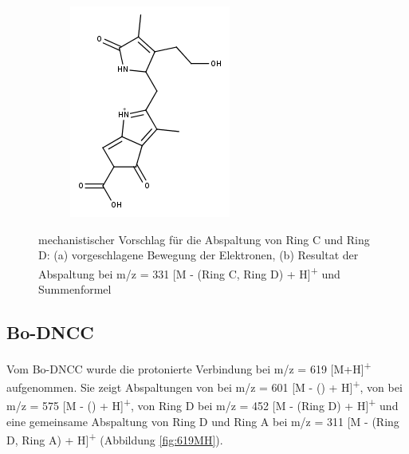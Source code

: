 \begin{figure}[!htbp]
\begin{subfigure}[b]{0.5\textwidth}
    \includegraphics[width=\textwidth]{figures/Kapitel7/Kataboliten/fragmentation_structures/VWA_Katabolit_617-RingD-RingC_331.png}
    \caption{}
    \label{fig:331MH}
  \end{subfigure}
  \caption[Abspaltungsmechanismus von Ring C und Ring D bei Bo-DYCC, Quelle: Autor]{mechanistischer Vorschlag für die Abspaltung von Ring C und Ring D: (a) vorgeschlagene Bewegung der Elektronen, (b) Resultat der Abspaltung bei m/z = 331 [M - (Ring C, Ring D) + H]\textsuperscript{+} und Summenformel }
\end{figure}

\pagebreak
\subsection{Bo-DNCC} \label{sec:ESIMSBoDNCC}

Vom Bo-DNCC wurde die protonierte Verbindung bei m/z = 619 [M+H]\textsuperscript{+} aufgenommen. Sie zeigt Abspaltungen von  bei m/z = 601 [M - () + H]\textsuperscript{+}, von  bei m/z = 575 [M - () + H]\textsuperscript{+}, von Ring D bei m/z = 452 [M - (Ring D) + H]\textsuperscript{+} und eine gemeinsame Abspaltung von Ring D und Ring A bei m/z = 311 [M - (Ring D, Ring A) + H]\textsuperscript{+} (Abbildung \ref{fig:619MH}). 

